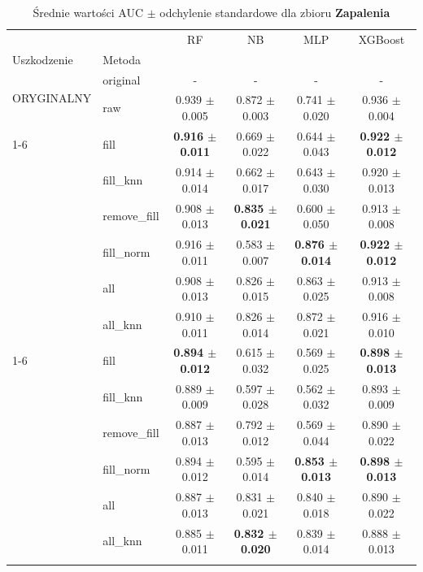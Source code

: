 \begin{table}[htbp]
\caption{Średnie wartości AUC $\pm$ odchylenie standardowe dla zbioru \textbf{Zapalenia}}
\label{tab:wyniki_zapalenia}
\begin{tabular}{llcccc}
\toprule
 &  & RF & NB & MLP & XGBoost \\
Uszkodzenie & Metoda &  &  &  &  \\
\midrule
\multirow[t]{2}{*}{ORYGINALNY} & original & - & - & - & - \\
 & raw & 0.939 $\pm$ 0.005 & 0.872 $\pm$ 0.003 & 0.741 $\pm$ 0.020 & 0.936 $\pm$ 0.004 \\
\cline{1-6}
\multirow[t]{7}{*}{10%
 & fill & \textbf{0.916 $\pm$ 0.011} & 0.669 $\pm$ 0.022 & 0.644 $\pm$ 0.043 & \textbf{0.922 $\pm$ 0.012} \\
 & fill_knn & 0.914 $\pm$ 0.014 & 0.662 $\pm$ 0.017 & 0.643 $\pm$ 0.030 & 0.920 $\pm$ 0.013 \\
 & remove_fill & 0.908 $\pm$ 0.013 & \textbf{0.835 $\pm$ 0.021} & 0.600 $\pm$ 0.050 & 0.913 $\pm$ 0.008 \\
 & fill_norm & 0.916 $\pm$ 0.011 & 0.583 $\pm$ 0.007 & \textbf{0.876 $\pm$ 0.014} & \textbf{0.922 $\pm$ 0.012} \\
 & all & 0.908 $\pm$ 0.013 & 0.826 $\pm$ 0.015 & 0.863 $\pm$ 0.025 & 0.913 $\pm$ 0.008 \\
 & all_knn & 0.910 $\pm$ 0.011 & 0.826 $\pm$ 0.014 & 0.872 $\pm$ 0.021 & 0.916 $\pm$ 0.010 \\
\cline{1-6}
\multirow[t]{7}{*}{20%
 & fill & \textbf{0.894 $\pm$ 0.012} & 0.615 $\pm$ 0.032 & 0.569 $\pm$ 0.025 & \textbf{0.898 $\pm$ 0.013} \\
 & fill_knn & 0.889 $\pm$ 0.009 & 0.597 $\pm$ 0.028 & 0.562 $\pm$ 0.032 & 0.893 $\pm$ 0.009 \\
 & remove_fill & 0.887 $\pm$ 0.013 & 0.792 $\pm$ 0.012 & 0.569 $\pm$ 0.044 & 0.890 $\pm$ 0.022 \\
 & fill_norm & 0.894 $\pm$ 0.012 & 0.595 $\pm$ 0.014 & \textbf{0.853 $\pm$ 0.013} & \textbf{0.898 $\pm$ 0.013} \\
 & all & 0.887 $\pm$ 0.013 & 0.831 $\pm$ 0.021 & 0.840 $\pm$ 0.018 & 0.890 $\pm$ 0.022 \\
 & all_knn & 0.885 $\pm$ 0.011 & \textbf{0.832 $\pm$ 0.020} & 0.839 $\pm$ 0.014 & 0.888 $\pm$ 0.013 \\
}}
\end{tabular}
\end{table}
